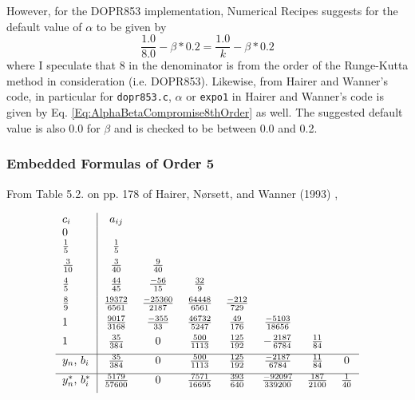 \documentclass[10pt]{amsart}
\begin{document}
\begin{multicols*}{2}
However, for the DOPR853 implementation, Numerical Recipes suggests for the default value of $\alpha$ to be given by
\begin{equation}\label{Eq:AlphaBetaCompromise8thOrder}
\frac{1.0}{8.0} - \beta * 0.2 = \frac{1.0}{k} - \beta * 0.2
\end{equation}
where I speculate that $8$ in the denominator is from the order of the Runge-Kutta method in consideration (i.e. DOPR853). Likewise, from Hairer and Wanner's code, in particular for \verb|dopr853.c|, $\alpha$ or \verb|expo1| in Hairer and Wanner's code is given by Eq. \ref{Eq:AlphaBetaCompromise8thOrder} as well. The suggested default value is also 0.0 for $\beta$ and is checked to be between 0.0 and 0.2.

\subsubsection{Embedded Formulas of Order 5}

From Table 5.2. on pp. 178 of Hairer, N\o rsett, and Wanner (1993) \cite{HNW1993},

\begin{equation}
	\begin{tabular}{ l|c c c c c c c}
		$c_i$ & $a_{ij}$ & & & & & & \\
		0 & & & & & & & \\
		$\frac{1}{5}$ & $\frac{1}{5}$ &  & & & & & \\[5pt]
		$\frac{3}{10}$ & $\frac{3}{40}$ & $\frac{9}{40}$ & & & & & \\[5pt]
		$\frac{4}{5}$  & $\frac{44}{45}$ & $\frac{-56}{15}$ & $\frac{32}{9}$ & & & & \\[5pt]
		$\frac{8}{9}$ & $\frac{19372}{6561}$ & $\frac{-25360}{2187}$ & $\frac{64448}{6561}$ & $\frac{-212}{729}$ & & & \\[5pt]
		$1$ & $\frac{9017}{3168}$ & $\frac{-355}{33}$ & $\frac{46732}{5247}$ & $\frac{49}{176}$ & $\frac{-5103}{18656}$ & & \\[5pt]
		$1$ & $\frac{35}{384}$ & $0$ & $\frac{500}{1113}$ & $\frac{125}{192}$ & $-\frac{2187}{6784}$ & $\frac{11}{84}$ & \\[5pt]
		\hline 
		$y_n$, $b_i$ & $\frac{35}{384}$ & $0$ & $\frac{500}{1113}$ & $\frac{125}{192}$ & $\frac{-2187}{6784}$ & $\frac{11}{84}$ & 0 \\[5pt]
		\hline
		$y^*_n$, $b^*_i$ & $\frac{5179}{57600}$ & $0$ & $\frac{7571}{16695}$ & $\frac{393}{640}$ & $\frac{-92097}{339200}$ & $\frac{187}{2100}$ & $\frac{1}{40}$ \\[5pt]
	\end{tabular}
\end{equation}


\end{multicols*}
\end{document}
